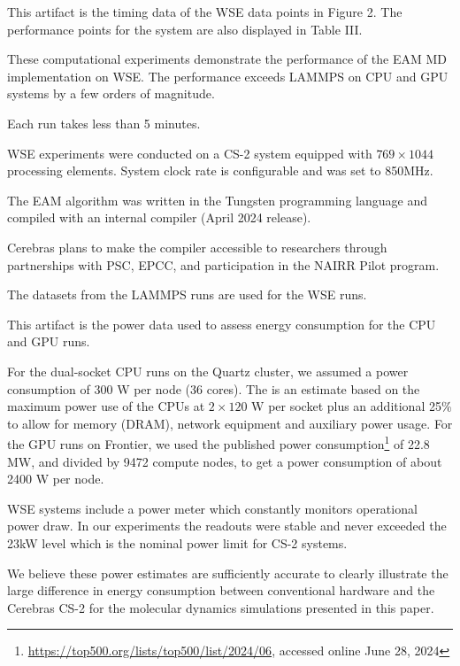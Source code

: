 \documentclass[conference]{IEEEtran}
\begin{document}
This artifact is the timing data of the WSE data points in Figure 2. The performance points for the system are also displayed in Table III.

\artexp

These computational experiments demonstrate the performance of the EAM MD implementation on WSE. The performance exceeds LAMMPS on CPU and GPU systems by a few orders of magnitude.

\arttime

Each run takes less than 5 minutes.

\artin


WSE experiments were conducted on a CS-2 system equipped with $769\times 1044$ processing elements. System clock rate is configurable and was set to 850MHz. 

The EAM algorithm was written in the Tungsten programming language and compiled with an internal compiler (April 2024 release). 

Cerebras plans to make the compiler accessible to researchers through partnerships with PSC, EPCC, and participation in the NAIRR Pilot program.


The datasets from the LAMMPS runs are used for the WSE runs.

\newartifact

\artrel

This artifact is the power data used to assess energy consumption for the CPU and GPU runs.

\artexp

For the dual-socket CPU runs on the Quartz cluster, we assumed a power consumption of 300 W per node (36 cores). The is an estimate based on the maximum power use of the CPUs at $2\times 120$ W per socket plus an additional 25\% to allow for memory (DRAM), network equipment and auxiliary power usage. For the GPU runs on Frontier, we used the published power consumption\footnote{\url{https://top500.org/lists/top500/list/2024/06}, accessed online June 28, 2024} of 22.8 MW, and divided by 9472 compute nodes, to get a power consumption of about 2400 W per node.

WSE systems include a power meter which constantly monitors operational power draw. In our experiments the readouts were stable and never exceeded the 23kW level which is the nominal power limit for CS-2 systems.

We believe these power estimates are sufficiently accurate to clearly illustrate the large difference in energy consumption between conventional hardware and the Cerebras CS-2 for the molecular dynamics simulations presented in this paper.
\end{document}
